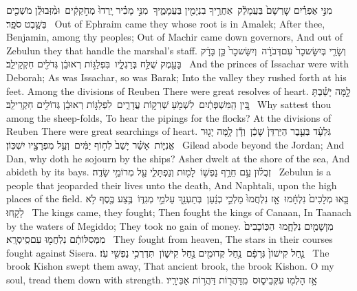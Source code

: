 {מִנִּ֣י אֶפְרַ֗יִם שׇׁרְשָׁם֙ בַּעֲמָלֵ֔ק \setuma  אַחֲרֶ֥יךָ בִנְיָמִ֖ין בַּעֲמָמֶ֑יךָ \setuma  מִנִּ֣י מָכִ֗יר יָֽרְדוּ֙ מְחֹ֣קְקִ֔ים \setuma  וּמִ֨זְּבוּלֻ֔ן מֹשְׁכִ֖ים בְּשֵׁ֥בֶט סֹפֵֽר׃ \setuma }
{Out of Ephraim came they whose root is in Amalek; After thee, Benjamin, among thy peoples; Out of Machir came down governors, And out of Zebulun they that handle the marshal’s staff.}
{וְשָׂרַ֤י בְּיִשָּׂשכָר֙ עִם\maqqaf דְּבֹרָ֔ה \setuma  וְיִשָּׂשכָר֙ כֵּ֣ן בָּרָ֔ק בָּעֵ֖מֶק שֻׁלַּ֣ח בְּרַגְלָ֑יו \setuma  בִּפְלַגּ֣וֹת רְאוּבֵ֔ן גְּדֹלִ֖ים חִקְקֵי\maqqaf לֵֽב׃ \setuma }
{And the princes of Issachar were with Deborah; As was Issachar, so was Barak; Into the valley they rushed forth at his feet. Among the divisions of Reuben There were great resolves of heart.}
{לָ֣מָּה יָשַׁ֗בְתָּ בֵּ֚ין הַֽמִּשְׁפְּתַ֔יִם \setuma  לִשְׁמֹ֖עַ שְׁרִק֣וֹת עֲדָרִ֑ים \setuma  לִפְלַגּ֣וֹת רְאוּבֵ֔ן גְּדוֹלִ֖ים חִקְרֵי\maqqaf לֵֽב׃ \setuma }
{Why sattest thou among the sheep-folds, To hear the pipings for the flocks? At the divisions of Reuben There were great searchings of heart.}
{גִּלְעָ֗ד בְּעֵ֤בֶר הַיַּרְדֵּן֙ שָׁכֵ֔ן \setuma  וְדָ֕ן לָ֥מָּה יָג֖וּר אֳנִיּ֑וֹת \setuma  אָשֵׁ֗ר יָשַׁב֙ לְח֣וֹף יַמִּ֔ים \setuma  וְעַ֥ל מִפְרָצָ֖יו יִשְׁכּֽוֹן׃ \setuma }
{Gilead abode beyond the Jordan; And Dan, why doth he sojourn by the ships? Asher dwelt at the shore of the sea, And abideth by its bays.}
{זְבֻל֗וּן עַ֣ם חֵרֵ֥ף נַפְשׁ֛וֹ \setuma  לָמ֖וּת וְנַפְתָּלִ֑י עַ֖ל מְרוֹמֵ֥י שָׂדֶֽה׃ \setuma }
{Zebulun is a people that jeoparded their lives unto the death, And Naphtali, upon the high places of the field.}
{בָּ֤אוּ מְלָכִים֙ נִלְחָ֔מוּ \setuma  אָ֤ז נִלְחֲמוּ֙ מַלְכֵ֣י כְנַ֔עַן \setuma  בְּתַעְנַ֖ךְ עַל\maqqaf מֵ֣י מְגִדּ֑וֹ \setuma  בֶּ֥צַע כֶּ֖סֶף לֹ֥א לָקָֽחוּ׃ \setuma }
{The kings came, they fought; Then fought the kings of Canaan, In Taanach by the waters of Megiddo; They took no gain of money.}
{מִן\maqqaf שָׁמַ֖יִם נִלְחָ֑מוּ \setuma  הַכּֽוֹכָבִים֙ מִמְּסִלּוֹתָ֔ם נִלְחֲמ֖וּ עִם\maqqaf סִֽיסְרָֽא׃ \setuma }
{They fought from heaven, The stars in their courses fought against Sisera.}
{נַ֤חַל קִישׁוֹן֙ גְּרָפָ֔ם \setuma  נַ֥חַל קְדוּמִ֖ים נַ֣חַל קִישׁ֑וֹן \setuma  תִּדְרְכִ֥י נַפְשִׁ֖י עֹֽז׃ \setuma }
{The brook Kishon swept them away, That ancient brook, the brook Kishon. O my soul, tread them down with strength.}
{אָ֥ז הָלְמ֖וּ עִקְּבֵי\maqqaf ס֑וּס \setuma  מִֽדַּהֲר֖וֹת דַּהֲר֥וֹת אַבִּירָֽיו׃ \setuma }
